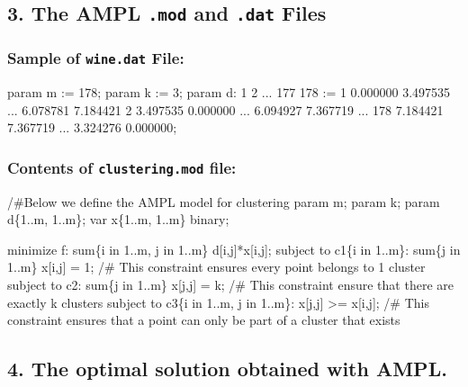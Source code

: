 \documentclass[
]{article}
\newenvironment{Shaded}{\begin{snugshade}}{\end{snugshade}}
\newcommand{\NormalTok}[1]{#1}
\begin{document}
\subsection{\texorpdfstring{3. The AMPL \texttt{.mod} and \texttt{.dat}
Files}{3. The AMPL .mod and .dat Files}}\label{the-ampl-.mod-and-.dat-files}

\subsubsection{\texorpdfstring{Sample of \texttt{wine.dat}
File:}{Sample of wine.dat File:}}\label{sample-of-wine.dat-file}

\begin{Shaded}
\begin{Highlighting}[]
\NormalTok{param m := 178;}
\NormalTok{param k := 3;}
\NormalTok{param d: 1 2 ... 177 178 :=}
\NormalTok{1   0.000000  3.497535 ...  6.078781  7.184421}
\NormalTok{2   3.497535  0.000000 ...  6.094927  7.367719}
\NormalTok{... }
\NormalTok{178 7.184421  7.367719 ...  3.324276  0.000000;}
\end{Highlighting}
\end{Shaded}

\subsubsection{\texorpdfstring{Contents of \texttt{clustering.mod}
file:}{Contents of clustering.mod file:}}\label{contents-of-clustering.mod-file}

\begin{Shaded}
\begin{Highlighting}[]
\NormalTok{/\#Below we define the AMPL model for clustering}
\NormalTok{param m;}
\NormalTok{param k;}
\NormalTok{param d\{1..m, 1..m\};}
\NormalTok{var x\{1..m, 1..m\} binary;}

\NormalTok{minimize f: sum\{i in 1..m, j in 1..m\} d[i,j]*x[i,j];}
\NormalTok{subject to c1\{i in 1..m\}: sum\{j in 1..m\} x[i,j] = 1;}
\NormalTok{/\# This constraint ensures every point belongs to 1 cluster}
\NormalTok{subject to c2: sum\{j in 1..m\} x[j,j] = k;}
\NormalTok{/\# This constraint ensure that there are exactly k clusters}
\NormalTok{subject to c3\{i in 1..m, j in 1..m\}: x[j,j] \textgreater{}= x[i,j];}
\NormalTok{/\# This constraint ensures that a point can only be part of a cluster that exists}
\end{Highlighting}
\end{Shaded}

\subsection{4. The optimal solution obtained with
AMPL.}\label{the-optimal-solution-obtained-with-ampl.}
\end{document}
